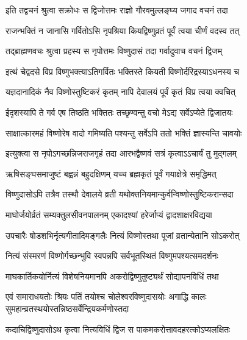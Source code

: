 \twolineshloka
{इति तद्वचनं श्रुत्वा सक्रोधः स द्विजोत्तमः}
{राज्ञो गौरवमुल्लङ्घ्य जगाद वचनं तदा} %


\twolineshloka
{राजन्भक्तिं न जानासि गर्वितोऽसि नृपश्रिया}
{कियद्विष्णुव्रतं पूर्वं त्वया चीर्णं वदस्व तत्} %


\twolineshloka
{तद्ब्राह्मणवचः श्रुत्वा प्रहस्य स नृपोत्तमः}
{विष्णुदासं तदा गर्वादुवाच वचनं द्विजम्} %


\twolineshloka
{इत्थं चेद्वदसे विप्र विष्णुभक्त्याऽतिगर्वितः}
{भक्तिस्ते कियती विष्णोर्दरिद्रस्याऽधनस्य च} %


\twolineshloka
{यज्ञदानादिकं नैव विष्णोस्तुष्टिकरं कृतम्}
{नापि देवालयं पूर्वं कृतं विप्र त्वया क्वचित्} %

\twolineshloka
{ईदृशस्यापि ते गर्व एष तिष्ठति भक्तितः}
{तच्छृण्वन्तु वचो मेऽद्य सर्वेऽप्येते द्विजातयः} %

\twolineshloka
{साक्षात्कारमहं विष्णोरेष वादो गमिष्यति}
{पश्यन्तु सर्वेऽपि ततो भक्तिं ज्ञास्यन्ति चावयोः} %


\twolineshloka
{इत्युक्त्वा स नृपोऽगच्छन्निजराजगृहं तदा}
{आरभद्वैष्णवं सत्रं कृत्वाऽऽचार्यं तु मुद्गलम्} %


\twolineshloka
{ऋषिसङ्घसमाजुष्टं बह्वन्नं बहुदक्षिणम्}
{यच्च ब्रह्मकृतं पूर्वं गयाक्षेत्रे समृद्धिमत्} %

\twolineshloka
{विष्णुदासोऽपि तत्रैव तस्थौ देवालये व्रती}
{यथोक्तनियमान्कुर्वन्विष्णोस्तुष्टिकरान्सदा} %

\twolineshloka
{माघोर्जयोर्व्रतं सम्यक्तुलसीवनपालनम्}
{एकादश्यां हरेर्जाप्यं द्वादशाक्षरविद्यया} %

\twolineshloka
{उपचारैः षोडशभिर्नृत्यगीतादिमङ्गलैः}
{नित्यं विष्णोस्तथा पूजां व्रतान्येतानि सोऽकरोत्} %

\twolineshloka
{नित्यं संस्मरणं विष्णोर्गच्छन्भुवि स्वपन्नपि}
{सर्वभूतस्थितं विष्णुमपश्यत्समदर्शनः} %

\twolineshloka
{माघकार्तिकयोर्नित्यं विशेषनियमानपि}
{अकरोद्विष्णुतुष्ट्यर्थं सोद्यापनविधिं तथा} %

\twolineshloka
{एवं समाराधयतोः श्रियः पतिं तयोश्च चोलेश्वरविष्णुदासयोः}
{अगाद्धि कालः सुमहान्व्रतस्थयोस्तन्निष्ठसर्वेन्द्रियकर्मणोस्तदा} %





\twolineshloka
{कदाचिद्विष्णुदासोऽथ कृत्वा नित्यविधिं द्विज}
{स पाकमकरोत्तावदहरत्कोऽप्यलक्षितः} %


